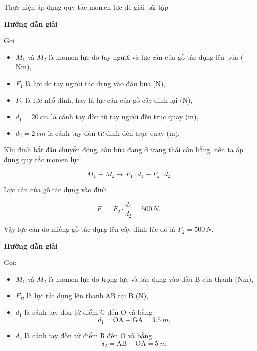\begin{dang}{Thực hiện áp dụng quy tắc momen lực để giải bài tập}
	{	\begin{center}
			\textbf{Hướng dẫn giải}
		\end{center}
		
		Gọi 
		\begin{itemize}
			\item $M_1$ và $M_2$ là momen lực do tay người và lực cản của gỗ tác dụng lên búa ($\textrm{Nm}$),
			\item $F_1$ là lực do tay người tác dụng vào đầu búa ($\textrm{N}$),
			\item $F_2$ là lực nhổ đinh, hay là lực cản của gỗ cây đinh lại ($\textrm{N}$), 
			\item  $d_1=\SI{20}{cm}$ là cánh tay đòn từ tay người đến trục quay ($\textrm{m}$), 
			\item  $d_2=\SI{2}{cm}$ là cánh tay đòn từ đinh đến trục quay ($\textrm{m}$). 
		\end{itemize}
		
		Khi đinh bắt đầu chuyển động, câu búa đang ở trạng thái cân bằng, nên ta áp dụng quy tắc momen lực
		
		$$M_1=M_2 \Rightarrow F_1\cdot d_1 = F_2\cdot d_2$$
		
		Lực cản của gỗ tác dụng vào đinh 
		
		$$F_2=F_2\cdot \dfrac{d_1}{d_2}=\SI{500}{N}.$$
		
		Vậy lực cản do miếng gỗ tác dụng lên cây đinh lúc đó là $F_2=\SI{500}{N}$.
	}
	{	\begin{center}
			\textbf{Hướng dẫn giải}
		\end{center}
		
		Gọi: 
		\begin{itemize}
			\item $M_1$ và $M_2$ là momen lực do trọng lực và tác dụng vào đầu B của thanh ($\textrm{Nm}$),
			\item $F_B$ là lực tác dụng lên thanh AB tại B ($\textrm{N}$), 
			\item  $d_1$ là cánh tay đòn từ điểm G đến O và bằng
			\begin{equation*}
				d_1 = \textrm{OA} - \textrm{GA} =\SI{0,5}{m},
			\end{equation*} 
			\item  $d_2$ là cánh tay đòn tử điểm B đến O và bằng
			\begin{equation*}
				d_2 = \textrm{AB} - \textrm{OA} =\SI{5}{m}. 
			\end{equation*} 
		\end{itemize}
		
}
\end{dang}
